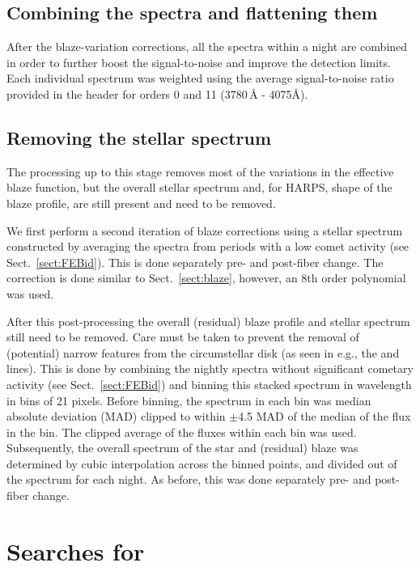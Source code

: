 \documentclass{aa}
\begin{document}
\subsection{Combining the spectra and flattening them}\label{sect:comb}

After the blaze-variation corrections, all the spectra within a night are combined in order to further boost the signal-to-noise and improve the detection limits.
%
Each individual spectrum was weighted using the average signal-to-noise ratio provided in the header for orders 0 and 11 (3780\,\AA{} - 4075\AA).%

\subsection{Removing the stellar spectrum}\label{sect:starcor}
The processing up to this stage removes most of the variations in the effective blaze function, but the overall stellar spectrum and, for HARPS, shape of the blaze profile, are still present and need to be removed. 

We first perform a second iteration of blaze corrections using a stellar spectrum constructed by averaging the spectra from periods with a low comet activity (see Sect.~\ref{sect:FEBid}).
%
This is done separately pre- and post-fiber change. The correction is done similar to Sect.~\ref{sect:blaze}, however, an 8th order polynomial was used.

After this post-processing the overall (residual) blaze profile and stellar spectrum still need to be removed.
%
Care must be taken to prevent the removal of (potential) narrow features from the circumstellar disk (as seen in e.g., the  and  lines).
%
This is done by combining the nightly spectra without significant cometary activity (see Sect.~\ref{sect:FEBid}) and binning this stacked spectrum in wavelength in bins of 21 pixels.
%
Before binning, the spectrum in each bin was median absolute deviation (MAD) clipped to within $\pm$4.5 MAD of the median of the flux in the bin.
%
The clipped average of the fluxes within each bin was used.
%
Subsequently, the overall spectrum of the star and (residual) blaze was determined by cubic interpolation across the binned points, and divided out of the spectrum for each night.
%
As before, this was done separately pre- and post-fiber change.

\section{Searches for \texorpdfstring{}{CN}}\label{sect:CNsearch}
\end{document}
